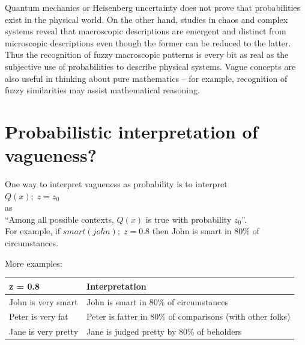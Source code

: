Quantum mechanics or Heisenberg uncertainty does not prove that probabilities exist in the physical world.  On the other hand, studies in chaos and complex systems reveal that macroscopic descriptions are emergent and distinct from microscopic descriptions even though the former can be reduced to the latter.  Thus the recognition of fuzzy macroscopic patterns is every bit as real as the subjective use of probabilities to describe physical systems.  Vague concepts are also useful in thinking about pure mathematics -- for example, recognition of fuzzy similarities may assist mathematical reasoning.


\section{Probabilistic interpretation of vagueness?}
\label{sec:probabilistic-interpretation}

One way to interpret vagueness as probability is to interpret\\
\hspace*{1cm} $Q(x); \; z = z_0$\\
as\\
\hspace*{1cm} ``Among all possible contexts, $Q(x)$ is true with probability $z_0$''.\\
For example, if $smart(john); \; z=0.8$ then John is smart in $80\%$ of circumstances.

More examples:\\
\hspace*{1cm} \begin{tabular}{|l|l|} \hline
\textbf{z = 0.8}             & \textbf{Interpretation}\\ \hline
John is very smart           & John is smart in $80\%$ of circumstances\\ \hline
Peter is very fat            & Peter is fatter in $80\%$ of comparisons (with other folks)\\ \hline
Jane is very pretty          & Jane is judged pretty by $80\%$ of beholders\\ \hline
\end{tabular}

%

